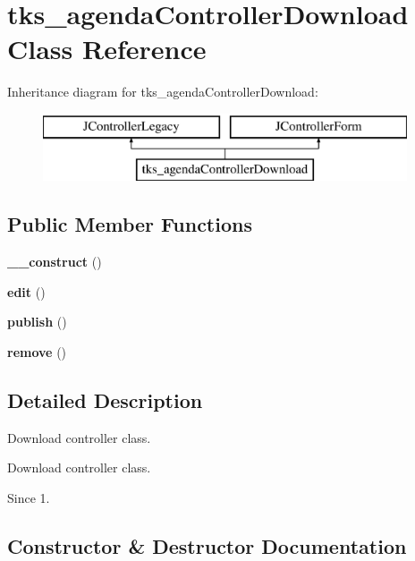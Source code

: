 \section{tks\+\_\+agenda\+Controller\+Download Class Reference}
\label{classtks__agenda_controller_download}
Inheritance diagram for tks\+\_\+agenda\+Controller\+Download\+:\begin{figure}[H]
\begin{center}
\leavevmode
\includegraphics[height=2.000000cm]{classtks__agenda_controller_download}
\end{center}
\end{figure}
\subsection*{Public Member Functions}
\begin{DoxyCompactItemize}
\item 
\textbf{ \+\_\+\+\_\+construct} ()
\item 
\textbf{ edit} ()
\item 
\textbf{ publish} ()
\item 
\textbf{ remove} ()
\end{DoxyCompactItemize}


\subsection{Detailed Description}
Download controller class.

Download controller class.

\begin{DoxySince}{Since}
1. 
\end{DoxySince}


\subsection{Constructor \& Destructor Documentation}
\mbox{\label{classtks__agenda_controller_download_a095c5d389db211932136b53f25f39685}} 
